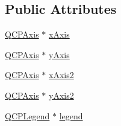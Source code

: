 \subsection*{Public Attributes}
\begin{DoxyCompactItemize}
\item 
\hyperlink{classQCPAxis}{Q\+C\+P\+Axis} $\ast$ \hyperlink{classQCustomPlot_a9a79cd0158a4c7f30cbc702f0fd800e4}{x\+Axis}
\item 
\hyperlink{classQCPAxis}{Q\+C\+P\+Axis} $\ast$ \hyperlink{classQCustomPlot_af6fea5679725b152c14facd920b19367}{y\+Axis}
\item 
\hyperlink{classQCPAxis}{Q\+C\+P\+Axis} $\ast$ \hyperlink{classQCustomPlot_ada41599f22cad901c030f3dcbdd82fd9}{x\+Axis2}
\item 
\hyperlink{classQCPAxis}{Q\+C\+P\+Axis} $\ast$ \hyperlink{classQCustomPlot_af13fdc5bce7d0fabd640f13ba805c0b7}{y\+Axis2}
\item 
\hyperlink{classQCPLegend}{Q\+C\+P\+Legend} $\ast$ \hyperlink{classQCustomPlot_a4eadcd237dc6a09938b68b16877fa6af}{legend}
\end{DoxyCompactItemize}
